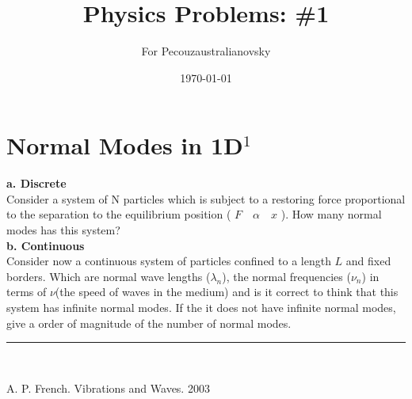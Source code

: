 \documentclass{article}
\begin{document}
\title{Physics Problems: \#1}

\author{For Pecouzaustralianovsky}

\date{\today}
\maketitle


\section*{Normal Modes in 1D$^1$}

\textbf{a. Discrete}\\

Consider a system of N particles which is subject to a restoring force proportional to the separation to the equilibrium position ( $F \quad \alpha \quad x$ ). How many normal modes has this system?\\

\textbf{b. Continuous }\\

Consider now a continuous system of particles confined to a length $L$ and fixed borders. Which are normal wave lengths ($\lambda_n$), the normal frequencies  ($\nu_n$) in terms of $\nu$(the speed of waves in the medium) and is it correct to think that this system has infinite normal modes. If the it does not have infinite normal modes, give a order of magnitude of the number of normal modes.

\vspace{2mm}

\begin{center}
\noindent\rule{8cm}{0.4pt}\\
\end{center}

\noindent [1] A. P. French. Vibrations and Waves. 2003
\end{document}
